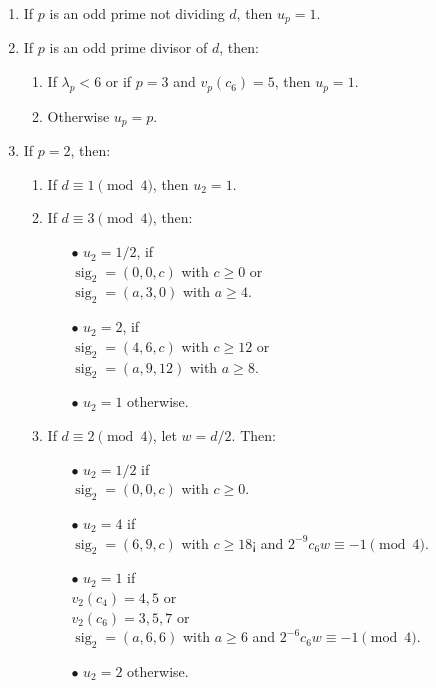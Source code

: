 \documentclass[
  journal=small,
  manuscript=article-type,  %
  year=2020,
  volume=37,
]{cup-journal}
\begin{document}
\begin{enumerate}
\item If $p$ is an odd prime not dividing $d$, then $u_p=1$.
\item If $p$ is an odd prime divisor of $d$, then:
	\begin{enumerate}
	\item If $\lambda_{p} <6$ or if $p=3$ and $v_p(c_6) =5$, then $u_p = 1$.
	\item Otherwise $u_p = p$.
	\end{enumerate}
\item If $p=2$, then: 
\begin{enumerate} 
		\item If $d \equiv 1 \pmod 4$, then $u_2 = 1$.
		\item If $d \equiv 3 \pmod 4$, then: 
	\begin{enumerate}	
			\item[$\bullet$] $u_2 = 1/2$, if\\ $\operatorname{sig}_2=(0,0,c)$ with $c\geq 0$ or\\
			$\operatorname{sig}_2=(a,3,0)$ with $a \geq 4$.
			\item[$\bullet$] $u_2 = 2$, if\\ $\operatorname{sig}_2=(4,6,c)$ with $c\geq 12$ or\\ $\operatorname{sig}_2=(a,9,12)$ with $a \geq 8$.
			\item[$\bullet$] $u_2 = 1$ otherwise.
	\end{enumerate}
		\item If $d \equiv 2 \pmod 4$, let $w=d/2$. Then:  
	\begin{enumerate}		
			\item[$\bullet$] $u_2 = 1/2$ if\\ $\operatorname{sig}_2 =(0,0,c)$ with $c\geq 0$.
			\item[$\bullet$] $u_2 = 4$ if\\ $\operatorname{sig}_2 =(6,9,c)$ with $c \geq 18¡$ and $2^{-9} c_6 w \equiv -1 \pmod 4$.
			\item[$\bullet$] $u_2 = 1$ if\\ $v_2(c_4)=4,5$ or \\
			$v_2(c_6)=3,5,7$ or\\ $\operatorname{sig}_2= (a,6,6)$ with $a \geq 6$ and $2^{-6} c_6 w \equiv -1 \pmod 4$.
			\item[$\bullet$] $u_2 = 2$ otherwise.
	\end{enumerate}
\end{enumerate}

\end{enumerate}
\end{document}
